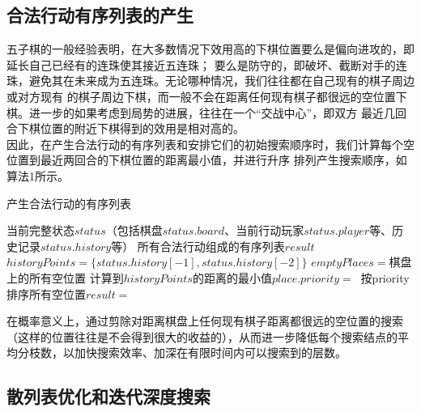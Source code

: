 \documentclass{acm_proc_article-sp}
\begin{document}
\subsection{\textbf{合法行动有序列表的产生}}
五子棋的一般经验表明，在大多数情况下效用高的下棋位置要么是偏向进攻的，即延长自己已经有的连珠使其接近五连珠；
要么是防守的，即破坏、截断对手的连珠，避免其在未来成为五连珠。无论哪种情况，我们往往都在自己现有的棋子周边或对方现有
的棋子周边下棋，而一般不会在距离任何现有棋子都很远的空位置下棋。进一步的如果考虑到局势的进展，往往在一个“交战中心”，即双方
最近几回合下棋位置的附近下棋得到的效用是相对高的。\\
因此，在产生合法行动的有序列表和安排它们的初始搜索顺序时，我们计算每个空位置到最近两回合的下棋位置的距离最小值，并进行升序
排列产生搜索顺序，如算法1所示。
\begin{algorithm}
       \algsetup{\tiny}
       \scriptsize
       \caption{产生合法行动的有序列表}
       \begin{algorithmic}[1] %
              \Require 当前完整状态$status$（包括棋盘$status.board$、当前行动玩家$status.player$等、历史记录$status.history$等）
              \Ensure 所有合法行动组成的有序列表$result$
                     \State $historyPoints = \{status.history[-1], status.history[-2]\}$
                     \State $emptyPlaces = $棋盘上的所有空位置
                            \State 计算到$historyPoints$的距离的最小值$place.priority =\ $
                     \EndFor
                     \State 按priority排序所有空位置$result =\ $
                     \State {}
              \EndFunction
       \end{algorithmic}
\end{algorithm}


在概率意义上，通过剪除对距离棋盘上任何现有棋子距离都很远的空位置的搜索
（这样的位置往往是不会得到很大的收益的），从而进一步降低每个搜索结点的平均分枝数，以加快搜索效率、加深在有限时间内可以搜索到的层数。\\

\subsection{\textbf{散列表优化和迭代深度搜索}}
\end{document}
